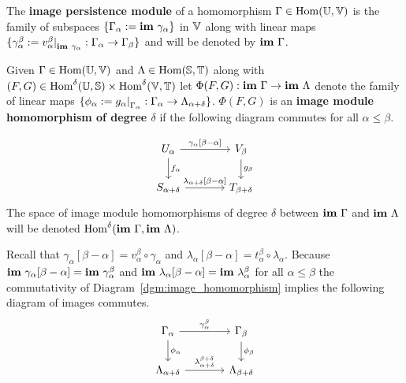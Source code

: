 \begin{definition}
  The \textbf{image persistence module} of a homomorphism $\Gamma\in\mathrm{Hom}(\mathbb{U},\mathbb{V})$ is the family of subspaces $\{\Gamma_\alpha :=\mathbf{im}~\gamma_\alpha\}$ in $\mathbb{V}$ along with linear maps $\{\gamma_\alpha^\beta := v_\alpha^\beta\mathord{\mid}_{\mathbf{im}~\gamma_\alpha} : \Gamma_\alpha\to\Gamma_\beta\}$ and will be denoted by $\mathbf{im}~\Gamma$.
\end{definition}

\begin{definition}
  Given $\Gamma\in\mathrm{Hom}(\mathbb{U},\mathbb{V})$ and $\Lambda\in\mathrm{Hom}(\mathbb{S},\mathbb{T})$ along with $(F,G)\in\mathrm{Hom}^\delta(\mathbb{U},\mathbb{S})\times\mathrm{Hom}^\delta(\mathbb{V},\mathbb{T})$ let $\Phi(F, G) : \mathbf{im}~\Gamma\to\mathbf{im}~\Lambda$ denote the family of linear maps $\{\phi_\alpha := g_\alpha\mathord{\mid}_{\Gamma_\alpha} : \Gamma_\alpha\to\Lambda_{\alpha+\delta}\}$.
  $\Phi(F, G)$ is an \textbf{image module homomorphism of degree $\delta$} if the following diagram commutes for all $\alpha\leq\beta$.

  \begin{equation}\label{dgm:image_homomorphism}
    \begin{tikzcd}[column sep=large]
        U_\alpha\arrow{r}{\gamma_\alpha[\beta-\alpha]}\arrow{d}{f_\alpha} &
      V_\beta\arrow{d}{g_\beta}\\
      S_{\alpha+\delta}\arrow{r}{\lambda_{\alpha+\delta}[\beta-\alpha]} &
      T_{\beta +\delta}
  \end{tikzcd}\end{equation}
  The space of image module homomorphisms of degree $\delta$ between $\mathbf{im}~\Gamma$ and $\mathbf{im}~\Lambda$ will be denoted $\mathrm{Hom}^\delta(\mathbf{im}~\Gamma,\mathbf{im}~\Lambda)$.
\end{definition}

Recall that $\gamma_\alpha[\beta-\alpha] = v_\alpha^\beta\circ\gamma_\alpha$ and $\lambda_\alpha[\beta-\alpha] = t_\alpha^\beta\circ\lambda_\alpha$.
Because $\mathbf{im}~\gamma_\alpha[\beta-\alpha] = \mathbf{im}~\gamma_\alpha^\beta$ and $\mathbf{im}~\lambda_{\alpha}[\beta-\alpha] = \mathbf{im}~\lambda_\alpha^\beta$ for all $\alpha\leq\beta$ the commutativity of Diagram~\ref{dgm:image_homomorphism} implies the following diagram of images commutes.
\begin{equation}\label{dgm:shifted_homomorphism}
  \begin{tikzcd}[column sep=large]
    \Gamma_\alpha\arrow{r}{\gamma_\alpha^\beta}\arrow{d}{\phi_\alpha} &
    \Gamma_\beta\arrow{d}{\phi_\beta}\\
    \Lambda_{\alpha+\delta}\arrow{r}{\lambda_{\alpha+\delta}^{\beta+\delta}} &
    \Lambda_{\beta +\delta}
\end{tikzcd}\end{equation}

